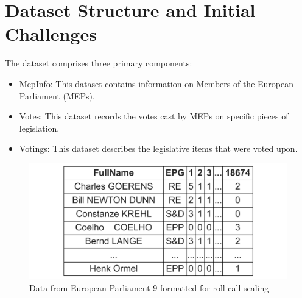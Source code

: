 \documentclass[a4paper,12pt]{report}
\begin{document}
        \section{Dataset Structure and Initial Challenges}

            The dataset comprises three primary components:


            \begin{itemize}
                \item MepInfo: This dataset contains information on Members of the European Parliament (MEPs).
                \item Votes: This dataset records the votes cast by MEPs on specific pieces of legislation.
                \item Votings: This dataset describes the legislative items that were voted upon.
            \end{itemize}
            \begin{figure}[htb]
                \centering
                \includegraphics[width=1\textwidth]{Graphs/short_table9}
                \caption{Data from European Parliament 9 formatted for roll-call scaling}
                \label{fig:Structure table}
            \end{figure}
\end{document}
